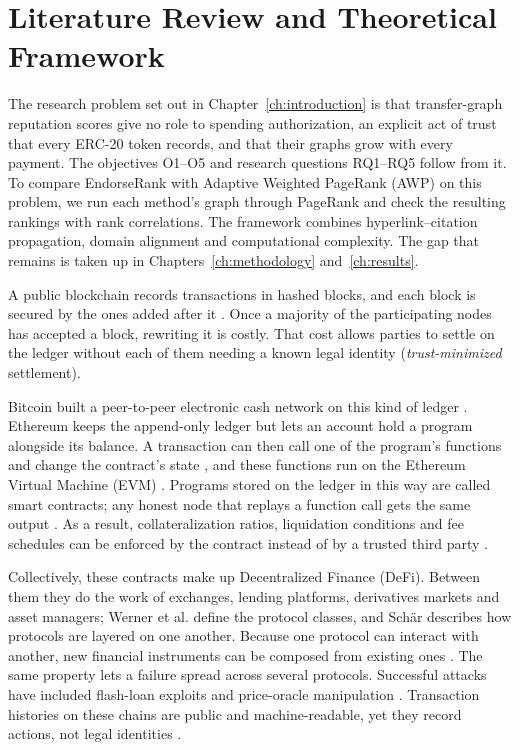 \chapter{Literature Review and Theoretical Framework}
\label{ch:literature}

The research problem set out in Chapter~\ref{ch:introduction} is that transfer-graph reputation scores give no role to spending authorization, an explicit act of trust that every ERC-20 token records, and that their graphs grow with every payment. The objectives O1--O5 and research questions RQ1--RQ5 follow from it. To compare EndorseRank with Adaptive Weighted PageRank (AWP) on this problem, we run each method's graph through PageRank and check the resulting rankings with rank correlations. The framework combines hyperlink--citation propagation, domain alignment and computational complexity. The gap that remains is taken up in Chapters~\ref{ch:methodology} and~\ref{ch:results}.


A public blockchain records transactions in hashed blocks, and each block is secured by the ones added after it . Once a majority of the participating nodes has accepted a block, rewriting it is costly. That cost allows parties to settle on the ledger without each of them needing a known legal identity (\emph{trust-minimized} settlement).

Bitcoin built a peer-to-peer electronic cash network on this kind of ledger . Ethereum keeps the append-only ledger but lets an account hold a program alongside its balance. A transaction can then call one of the program's functions and change the contract's state , and these functions run on the Ethereum Virtual Machine (EVM) . Programs stored on the ledger in this way are called smart contracts; any honest node that replays a function call gets the same output . As a result, collateralization ratios, liquidation conditions and fee schedules can be enforced by the contract instead of by a trusted third party .

Collectively, these contracts make up Decentralized Finance (DeFi). Between them they do the work of exchanges, lending platforms, derivatives markets and asset managers; Werner et al. define the protocol classes, and Sch\"{a}r describes how protocols are layered on one another. Because one protocol can interact with another, new financial instruments can be composed from existing ones . The same property lets a failure spread across several protocols. Successful attacks have included flash-loan exploits  and price-oracle manipulation . Transaction histories on these chains are public and machine-readable, yet they record actions, not legal identities .

